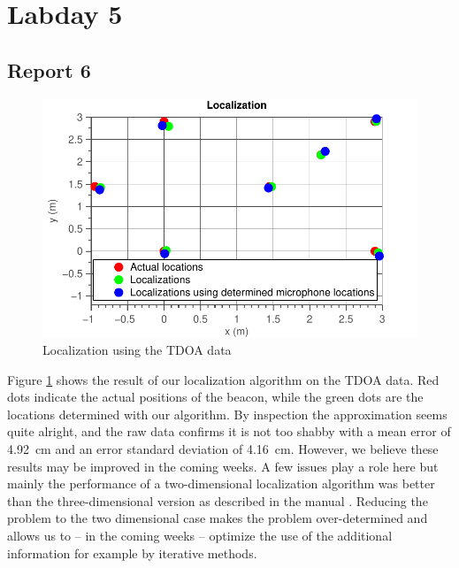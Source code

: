 \documentclass[11pt,titlepage]{report}
\begin{document}
\section{Labday 5}
\subsection{Report 6}
\begin{figure}[H]
	\begin{center}
		\includegraphics[width=.6\linewidth]{../../deliverable-7-resources/figures/ass-2/report-6/ass-2-report-6.pdf}
	\end{center}
	\caption{Localization using the TDOA data}
	\label{fig:ass-2-rep-6}
\end{figure}
Figure \ref{fig:ass-2-rep-6} shows the result of our localization algorithm on the TDOA data. Red dots indicate the actual positions of the beacon, while the green dots are the locations determined with our algorithm. By inspection the approximation seems quite alright, and the raw data confirms it is not too shabby with a mean error of \SI{4.92}{\centi\meter} and an error standard deviation of \SI{4.16}{\centi\meter}. However, we believe these results may be improved in the coming weeks. A few issues play a role here but mainly the performance of a two-dimensional localization algorithm was better than the three-dimensional version as described in the manual \cite{epo4-manual}. Reducing the problem to the two dimensional case makes the problem over-determined and allows us to -- in the coming weeks -- optimize the use of the additional information for example by iterative methods. 
\end{document}
